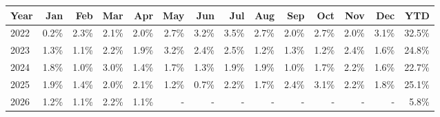 \begin{tabular}{lrrrrrrrrrrrrr}
\toprule
\bfseries Year & \bfseries Jan & \bfseries Feb & \bfseries Mar & \bfseries Apr & \bfseries May & \bfseries Jun & \bfseries Jul & \bfseries Aug & \bfseries Sep & \bfseries Oct & \bfseries Nov & \bfseries Dec & \bfseries YTD \\
\midrule
2022 & \cellcolor{posgreen!2!white}0.2\% & \cellcolor{posgreen!23!white}2.3\% & \cellcolor{posgreen!21!white}2.1\% & \cellcolor{posgreen!20!white}2.0\% & \cellcolor{posgreen!27!white}2.7\% & \cellcolor{posgreen!32!white}3.2\% & \cellcolor{posgreen!35!white}3.5\% & \cellcolor{posgreen!27!white}2.7\% & \cellcolor{posgreen!20!white}2.0\% & \cellcolor{posgreen!27!white}2.7\% & \cellcolor{posgreen!20!white}2.0\% & \cellcolor{posgreen!31!white}3.1\% & \cellcolor{posgreen!100!white}32.5\% \\
2023 & \cellcolor{posgreen!13!white}1.3\% & \cellcolor{posgreen!11!white}1.1\% & \cellcolor{posgreen!22!white}2.2\% & \cellcolor{posgreen!19!white}1.9\% & \cellcolor{posgreen!32!white}3.2\% & \cellcolor{posgreen!24!white}2.4\% & \cellcolor{posgreen!25!white}2.5\% & \cellcolor{posgreen!12!white}1.2\% & \cellcolor{posgreen!13!white}1.3\% & \cellcolor{posgreen!12!white}1.2\% & \cellcolor{posgreen!24!white}2.4\% & \cellcolor{posgreen!16!white}1.6\% & \cellcolor{posgreen!100!white}24.8\% \\
2024 & \cellcolor{posgreen!18!white}1.8\% & \cellcolor{posgreen!10!white}1.0\% & \cellcolor{posgreen!30!white}3.0\% & \cellcolor{posgreen!14!white}1.4\% & \cellcolor{posgreen!17!white}1.7\% & \cellcolor{posgreen!13!white}1.3\% & \cellcolor{posgreen!19!white}1.9\% & \cellcolor{posgreen!19!white}1.9\% & \cellcolor{posgreen!10!white}1.0\% & \cellcolor{posgreen!17!white}1.7\% & \cellcolor{posgreen!22!white}2.2\% & \cellcolor{posgreen!16!white}1.6\% & \cellcolor{posgreen!100!white}22.7\% \\
2025 & \cellcolor{posgreen!19!white}1.9\% & \cellcolor{posgreen!14!white}1.4\% & \cellcolor{posgreen!20!white}2.0\% & \cellcolor{posgreen!21!white}2.1\% & \cellcolor{posgreen!12!white}1.2\% & \cellcolor{posgreen!7!white}0.7\% & \cellcolor{posgreen!22!white}2.2\% & \cellcolor{posgreen!17!white}1.7\% & \cellcolor{posgreen!24!white}2.4\% & \cellcolor{posgreen!31!white}3.1\% & \cellcolor{posgreen!22!white}2.2\% & \cellcolor{posgreen!18!white}1.8\% & \cellcolor{posgreen!100!white}25.1\% \\
2026 & \cellcolor{posgreen!12!white}1.2\% & \cellcolor{posgreen!11!white}1.1\% & \cellcolor{posgreen!22!white}2.2\% & \cellcolor{posgreen!11!white}1.1\% & - & - & - & - & - & - & - & - & \cellcolor{posgreen!58!white}5.8\% \\
\bottomrule
\end{tabular}
